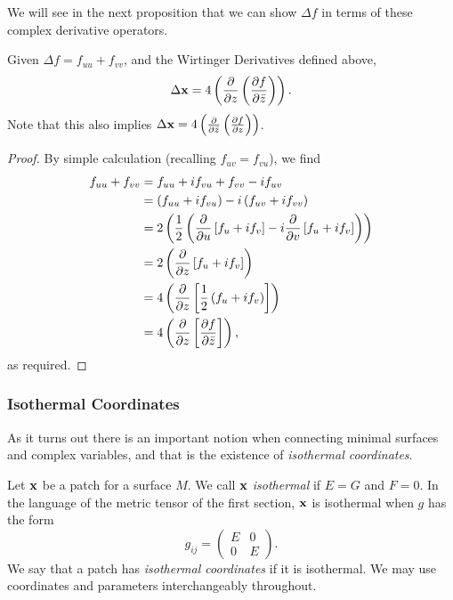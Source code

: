     We will see in the next proposition that we can show $\Delta f$ in terms of these complex derivative operators.
    \begin{prop}
      \label{prop:deltax}
      Given $\Delta f = f_{uu} + f_{vv}$, and the Wirtinger Derivatives defined above,
      \[
        \Delta\mathbf{x} = 4\left(\frac{\partial}{\partial z}\left(\frac{\partial f}{\partial \bar{z}}\right)\right).
      \]
      Note that this also implies $\Delta\mathbf{x} = 4\left(\frac{\partial}{\partial \bar{z}}\left(\frac{\partial f}{\partial z}\right)\right)$.
    \end{prop}
    \begin{proof}
      By simple calculation (recalling $f_{uv} = f_{vu}$), we find
      \begin{align*}
        f_{uu} + f_{vv} &= f_{uu} + if_{vu} + f_{vv} - if_{uv}\\
        &= \left(f_{uu} + if_{vu}\right) - i\left(f_{uv} + if_{vv}\right)\\
        &= 2\left(\frac{1}{2}\left(\frac{\partial}{\partial u}\left[f_u + if_v\right] - i\frac{\partial}{\partial v}\left[f_u + if_v\right]\right)\right)\\
        &= 2\left(\frac{\partial}{\partial z}\left[f_u + if_v\right]\right)\\
        &= 4\left(\frac{\partial}{\partial z}\left[\frac{1}{2}\left(f_u + if_v\right)\right]\right)\\
        &= 4\left(\frac{\partial}{\partial z}\left[\frac{\partial f}{\partial \bar{z}}\right]\right),
      \end{align*}
      as required.
    \end{proof}

  \subsubsection{Isothermal Coordinates}
    As it turns out there is an important notion when connecting minimal surfaces and complex variables, and that is the existence of \emph{isothermal coordinates}. 

    \begin{defn}
      Let $\mathbf{x}$ be a patch for a surface $M$. We call $\mathbf{x}$ \emph{isothermal} if $E = G$ and $F = 0$. In the language of the metric tensor of the first section, $\mathbf{x}$ is isothermal when $g$ has the form
      \[
        g_{ij} = \left(\begin{array}{cc}
          E & 0\\
          0 & E
        \end{array}
        \right).
      \]
      We say that a patch has \emph{isothermal coordinates} if it is isothermal. We may use coordinates and parameters interchangeably throughout.
    \end{defn}

